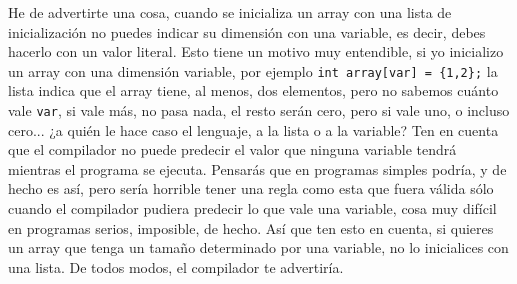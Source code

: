\documentclass[a4paper]{article}
\begin{document}
He de advertirte una cosa, cuando se inicializa un array con una lista de
inicialización no puedes indicar su dimensión con una variable, es decir,
debes hacerlo con un valor literal. Esto tiene un motivo muy entendible, si
yo inicializo un array con una dimensión variable, por ejemplo
\verb!int array[var] = {1,2};! la lista indica que el array
tiene, al menos, dos elementos, pero no sabemos cuánto vale \verb!var!, si
vale más, no pasa nada, el resto serán cero, pero si vale uno, o incluso cero...
¿a quién le hace caso el lenguaje, a la lista o a la variable? Ten en cuenta
que el compilador no puede predecir el valor que ninguna variable tendrá
mientras el programa se ejecuta. Pensarás que en programas simples podría,
y de hecho
es así, pero sería horrible tener una regla como esta que fuera válida sólo
cuando el compilador pudiera predecir lo que vale una variable, cosa muy
difícil en programas serios, imposible, de hecho.
Así que ten esto en cuenta, si quieres un array que tenga un tamaño determinado
por una variable, no lo inicialices con una lista. De todos modos, el compilador
te advertiría.
\end{document}

